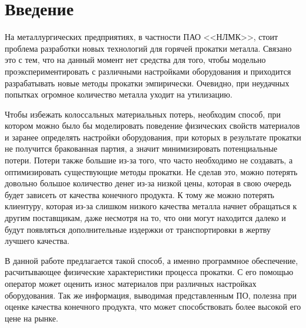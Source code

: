 \section*{Введение}

На металлургических предприятиях, в частности ПАО <<НЛМК>>, стоит проблема разработки новых технологий для горячей прокатки металла. Связано это с тем, что на данный момент нет средства для того, чтобы модельно проэкспериментировать с различными настройками оборудования и приходится разрабатывать новые методы прокатки эмпирически. Очевидно, при неудачных попытках огромное количество металла уходит на утилизацию. 

Чтобы избежать колоссальных материальных потерь, необходим способ, при котором можно было бы моделировать поведение физических свойств материалов и заранее определять настройки оборудования, при которых в результате прокатки не получится бракованная партия, а значит минимизировать потенциальные потери. Потери также большие из-за того, что часто необходимо не создавать, а оптимизировать существующие методы прокатки. Не сделав это, можно потерять довольно большое количество денег из-за низкой цены, которая в свою очередь будет зависеть от качества конечного продукта. К тому же можно потерять клиентуру, которая из-за слишком низкого качества металла начнет обращаться к другим поставщикам, даже несмотря на то, что они могут находится далеко и будут появляться дополнительные издержки от транспортировки в жертву лучшего качества.

В данной работе предлагается такой способ, а именно программное обеспечение, расчитывающее физические характеристики процесса прокатки. С его помощью оператор может оценить износ материалов при различных настройках оборудования. Так же информация, выводимая представленным ПО, полезна при оценке качества конечного продукта, что может способствовать более высокой его цене на рынке.
\newpage
